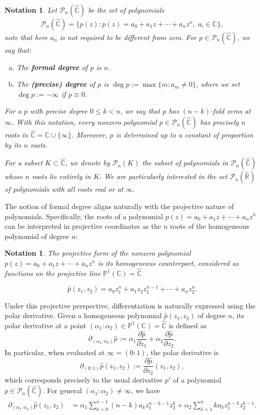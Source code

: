 \documentclass[reqno,11pt]{amsart}
\newtheorem{notation}[theorem]{Notation}
\theoremstyle{remark}
\newcommand{\cc}{\mathbb{C}}
\newcommand{\rr}{\mathbb{R}}
\newcommand{\pol}{\mathcal{P}}
\begin{document}
\begin{notation}
    Let $\pol_n(\hat{\cc})$ be the set of polynomials
    $$ \pol_n(\hat{\cc}) = \{ p(z): p(z)= a_0+a_1z+\cdots + a_nz^n,\;a_i\in \cc \}, $$
    note that here $ a_n $ is not required to be different from zero. For $p\in \pol_n(\hat{\cc})$, we say that:
    \begin{enumerate}[a)]
        \item The \textbf{formal degree} of $p$ is $n$.
        \item The \textbf{(precise) degree} of $p$ is $ 
\deg p := \max\{m: a_m\neq 0\} $, where we set $ \deg p:= -\infty $ if $p \equiv 0$.
    \end{enumerate}
    
    For a $p$ with precise degree $0\leq k<n$, we say that $p$ has $(n-k)$-fold zeros at $\infty$. With this notation, every nonzero polynomial $ p\in \pol_n(\hat{\cc}) $ has precisely $ n $ roots in $ \hat{\cc} = \cc\cup \{\infty\} $. Moreover, $p$ is determined up to a constant of proportion by its $n$ roots.
    
    For a subset $K\subset \hat{\cc}$, we denote by $\pol_n(K)$ the subset of polynomials in $ \pol_n(\hat{\cc})$ whose $n$ roots lie entirely in $K$. We are particularly interested in the set $\pol_n(\hat{\rr})$ of polynomials with all roots real or at $\infty$.
\end{notation}

The notion of formal degree aligns naturally with the projective nature of polynomials. Specifically, the roots of a polynomial $ p(z)= a_0+a_1z+\cdots + a_nz^n $ can be interpreted in projective coordinates as the $n$ roots of the homogeneous polynomial of degree $n$:
\begin{notation}
    The projective form of the nonzero polynomial $p(z) = a_0+a_1z+\cdots + a_nz^n$ is its homogeneous counterpart, considered as functions on the projective line $\mathbb{P}^1(\cc) = \hat{\cc}$

    $$ \hat{p}(z_1,z_2) = a_0z_1^n+a_1 z_2z_1^{n-1}+\cdots+ a_nz_2^n. $$
\end{notation}


Under this projective perspective, differentiation is naturally expressed using the polar derivative. Given a homogeneous polynomial $\hat{p}(z_1,z_2)$ of degree $n$, its polar derivative at a point $ (\alpha_1:\alpha_2)\in \mathbb{P}^1(\cc) = \hat{\cc}$ is defined as
$$ \partial_{ (\alpha_1:\alpha_2) }\hat{p} := \alpha_1\frac{\partial\hat{p}}{\partial z_1}+ \alpha_2\frac{\partial\hat{p}}{\partial z_2} .$$
In particular, when evaluated at $\infty = (0:1)$, the polar derivative is
$$ \partial_{ (0:1) }\hat{p}(z_1,z_2) := \frac{\partial\hat{p}}{\partial z_2}(z_1,z_2), $$
which corresponds precisely to the usual derivative $p'$ of a polynomial $p\in \pol_n(\hat{\cc})$. For general $ (\alpha_1:\alpha_2) \neq \infty $, we have
\begin{align*}
    \partial_{ (\alpha_1:\alpha_2)}\hat{p}(z_1,z_2) &= \alpha_1 \sum_{k=0}^{n-1} (n-k) a_k z_1^{n-k-1} z_2^{k} + \alpha_2 \sum_{k=1}^{n} k a_k z_1^{n-k} z_2^{k-1}.
\end{align*}
\end{document}
